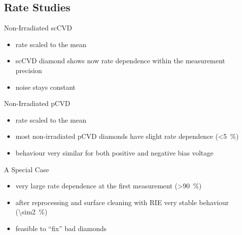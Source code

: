 \subsection{Rate Studies}
\begin{frame}{Non-Irradiated scCVD}

	
	\begin{itemize}\itemfill
		\item rate scaled to the mean
		\item scCVD diamond shows now rate dependence within the measurement precision
		\item noise stays constant
	\end{itemize}
	
\end{frame}
\begin{frame}{Non-Irradiated pCVD}
 
	
	\begin{itemize} \itemfill
		\item rate scaled to the mean
		\item most non-irradiated pCVD diamonds have slight rate dependence (\SI{<5}{\%})
		\item behaviour very similar for both positive and negative bias voltage
	\end{itemize}
 
\end{frame}
\begin{frame}{A Special Case}

	
	\begin{itemize}\itemfill
		\item very large rate dependence at the first measurement (\SI{>90}{\%})
		\item after reprocessing and surface cleaning with RIE very stable behaviour (\SI{\sim2}{\%})
		\item feasible to ``fix'' bad diamonds
	\end{itemize}

\end{frame}
